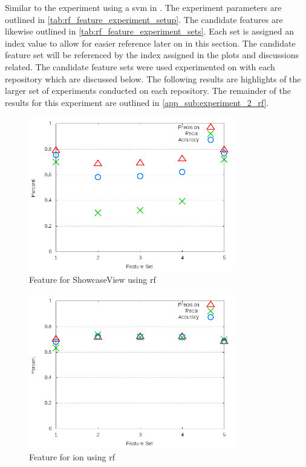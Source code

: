 
Similar to the experiment using a \gls{svm} in . The experiment parameters are outlined in \autoref{tab:rf_feature_experiment_setup}. The candidate features are likewise outlined in \autoref{tab:rf_feature_experiment_sets}. Each set is assigned an index value to allow for easier reference later on in this section. The candidate feature set will be referenced by the index assigned in the plots and discussions related. The candidate feature sets were used experimented on with each repository which are discussed below. The following results are highlights of the larger set of experiments conducted on each repository. The remainder of the results for this experiment are outlined in \autoref{app_sub:experiment_2_rf}.

\begin{figure}[!ht]
    \centering
        \includegraphics[width=0.8\textwidth]{images/rf/test_3/ShowcaseView_sample_range}
        \caption{Feature for ShowcaseView using \gls{rf}}
        \label{fig:test_3_ShowcaseView_rf}
\end{figure}

\begin{figure}[!ht]
    \centering
        \includegraphics[width=0.8\textwidth]{images/rf/test_3/ion_sample_range}
    \caption{Feature for ion using \gls{rf}}
    \label{fig:test_3_ion_rf}
\end{figure}


